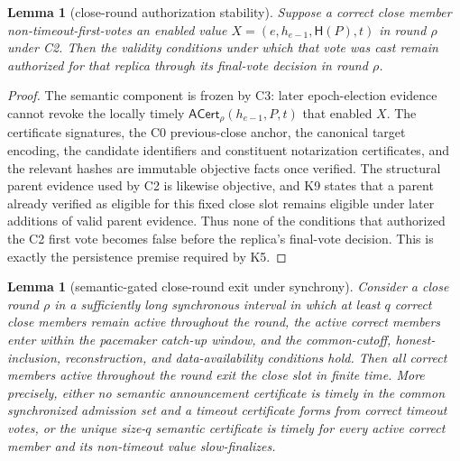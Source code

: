 \documentclass[11pt]{article}
\newtheorem{lemma}[theorem]{Lemma}
\theoremstyle{definition}
\theoremstyle{remark}
\newcommand{\hash}{\mathsf{H}}
\newcommand{\ACert}{\mathsf{ACert}}
\begin{document}
\begin{lemma}[close-round authorization stability]
\label{lem:close-auth-stability}
Suppose a correct close member non-timeout-first-votes an enabled value $X=(e,h_{e-1},\hash(P),t)$ in round $\rho$ under C2. Then the validity conditions under which that vote was cast remain authorized for that replica through its final-vote decision in round $\rho$.
\end{lemma}

\begin{proof}
The semantic component is frozen by C3: later epoch-election evidence cannot revoke the locally timely $\ACert_\rho(h_{e-1},P,t)$ that enabled $X$. The certificate signatures, the C0 previous-close anchor, the canonical target encoding, the candidate identifiers and constituent notarization certificates, and the relevant hashes are immutable objective facts once verified. The structural parent evidence used by C2 is likewise objective, and K9 states that a parent already verified as eligible for this fixed close slot remains eligible under later additions of valid parent evidence. Thus none of the conditions that authorized the C2 first vote becomes false before the replica's final-vote decision. This is exactly the persistence premise required by K5.
\end{proof}

\begin{lemma}[semantic-gated close-round exit under synchrony]
\label{lem:close-round-exit}
Consider a close round $\rho$ in a sufficiently long synchronous interval in which at least $q$ correct close members remain active throughout the round, the active correct members enter within the pacemaker catch-up window, and the common-cutoff, honest-inclusion, reconstruction, and data-availability conditions hold. Then all correct members active throughout the round exit the close slot in finite time. More precisely, either no semantic announcement certificate is timely in the common synchronized admission set and a timeout certificate forms from correct timeout votes, or the unique size-$q$ semantic certificate is timely for every active correct member and its non-timeout value slow-finalizes.
\end{lemma}
\end{document}
